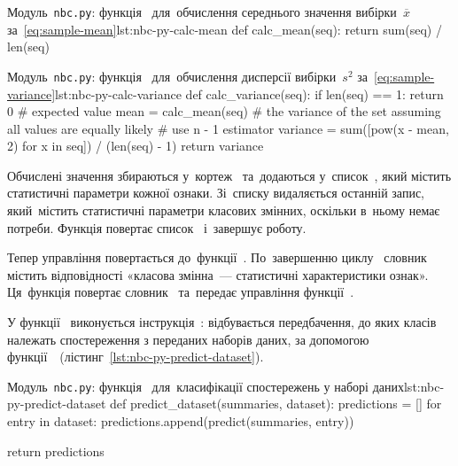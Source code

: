 \documentclass[
	a4paper,
	oneside,
	DIV = 12,
	fontsize = 13pt,
	headings = normal,
	numbers = endperiod,
	bibliography = totoc, %
]{scrartcl}
\theoremstyle{mythm}
\newcommand{\filename}[1]{\texttt{#1}}
\begin{document}
						\begin{listingpython}{Модуль~\filename{nbc.py}: функція~ для~обчислення середнього значення вибірки~$\overline{x}$ за~\eqref{eq:sample-mean}}{lst:nbc-py-calc-mean}
		def calc_mean(seq):
				return sum(seq) / len(seq)
						\end{listingpython}

						\begin{listingpython}{Модуль~\filename{nbc.py}: функція~ для~обчислення дисперсії вибірки~$s^2$ за~\eqref{eq:sample-variance}}{lst:nbc-py-calc-variance}
		def calc_variance(seq):
				if len(seq) == 1:
						return 0
				# expected value
				mean = calc_mean(seq)
				# the variance of the set assuming all values are equally likely
				# use n - 1 estimator
				variance = sum([pow(x - mean, 2) for x in seq]) / (len(seq) - 1)
				return variance
						\end{listingpython}

						Обчислені значення збираються у~кортеж~ та~додаються у~список~, який містить статистичні параметри кожної ознаки. Зі~списку видаляється останній запис, який~містить статистичні параметри класових змінних, оскільки в~ньому немає потреби. Функція повертає список~ і~завершує роботу.
						
						Тепер управління повертається до~функції~. По~завершенню циклу~ словник~ містить відповідності «класова змінна~— статистичні характеристики ознак». Ця~функція повертає словник~ та~передає управління функції~.

						У функції~ виконується інструкція~: відбувається передбачення, до яких класів належать спостереження з переданих наборів даних, за допомогою функції~~(лістинг~\ref{lst:nbc-py-predict-dataset}).

						\begin{listingpython}{Модуль~\filename{nbc.py}: функція~ для~класифікації спостережень у наборі даних}{lst:nbc-py-predict-dataset}
		def predict_dataset(summaries, dataset):
				predictions = []
				for entry in dataset:
						predictions.append(predict(summaries, entry))

				return predictions
						\end{listingpython}
\end{document}
